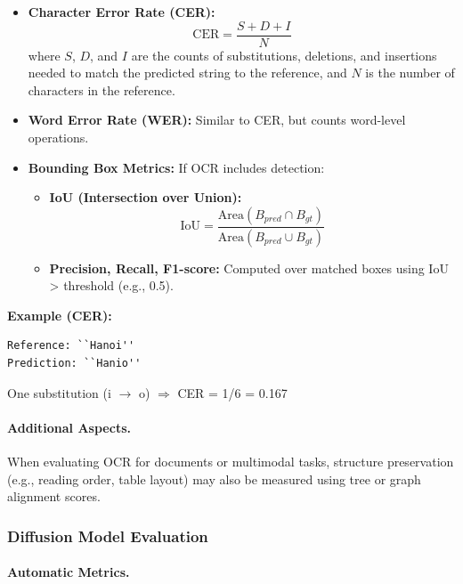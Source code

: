 \documentclass[conference]{IEEEtran}
\begin{document}
\begin{itemize}
	\item \textbf{Character Error Rate (CER):}
	\begin{equation}
		\text{CER} = \frac{S + D + I}{N}
	\end{equation}
	where $S$, $D$, and $I$ are the counts of substitutions, deletions, and insertions needed to match the predicted string to the reference, and $N$ is the number of characters in the reference.
	
	\item \textbf{Word Error Rate (WER):} Similar to CER, but counts word-level operations.
	
	\item \textbf{Bounding Box Metrics:} If OCR includes detection:
	\begin{itemize}
		\item \textbf{IoU (Intersection over Union):}
		\begin{equation}
			\text{IoU} = \frac{\text{Area}(B_{pred} \cap B_{gt})}{\text{Area}(B_{pred} \cup B_{gt})}
		\end{equation}
		\item \textbf{Precision, Recall, F1-score:} Computed over matched boxes using IoU > threshold (e.g., 0.5).
	\end{itemize}
\end{itemize}
\noindent\textbf{Example (CER):}
{\small
	\begin{verbatim}
Reference: ``Hanoi''
Prediction: ``Hanio'' 
	\end{verbatim}
}
One substitution (i $\rightarrow$ o) $\Rightarrow$ CER = 1/6 = 0.167

\paragraph{Additional Aspects.} When evaluating OCR for documents or multimodal tasks, structure preservation (e.g., reading order, table layout) may also be measured using tree or graph alignment scores.

\subsubsection{Diffusion Model Evaluation}

\paragraph{Automatic Metrics.}
\end{document}
